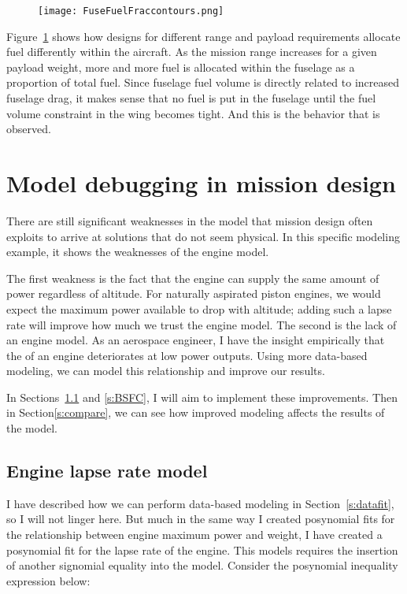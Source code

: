 \begin{center}
\begin{figure}
    \texttt{[image: FuseFuelFraccontours.png]}
    \caption{}
    \label{f:fusefuelfrac}
\end{figure}
\end{center}

Figure~\ref{f:fusefuelfrac} shows how designs for different range and payload requirements
allocate fuel differently within the aircraft. As the mission range increases for a given payload weight,
more and more fuel is allocated within the fuselage as a proportion of total fuel. Since fuselage fuel
volume is directly related to increased fuselage drag, it makes sense that no fuel is put in the fuselage
until the fuel volume constraint in the wing becomes tight. And this is the behavior that is observed.

\section{Model debugging in mission design}

There are still significant weaknesses in the model that mission design often exploits to arrive at solutions
that do not seem physical. In this specific modeling example, it shows the weaknesses of the engine model.

The first weakness is the fact that the engine can supply the same amount of power
regardless of altitude. For naturally aspirated piston engines, we would expect the maximum power available to
drop with altitude; adding such a lapse rate will improve how much we trust the engine model.
The second is the lack of an engine \BSFC model. As an aerospace engineer, I have the insight
empirically that the \BSFC of an engine deteriorates at low power outputs.  Using more
data-based modeling, we can model this relationship and improve our results.

In Sections~\ref{s:lapse} and \ref{s:BSFC}, I will aim to implement these improvements. Then in Section\ref{s:compare},
we can see how improved modeling affects the results of the model.

\subsection{Engine lapse rate model}
\label{s:lapse}

I have described how we can perform data-based modeling in Section~\ref{s:datafit}, so I will
not linger here. But much in the same way I created posynomial fits for the relationship between
engine maximum power and weight, I have created a posynomial fit for the lapse rate of the engine.
This models requires the insertion of another signomial equality into the model. Consider the
posynomial inequality expression below:


